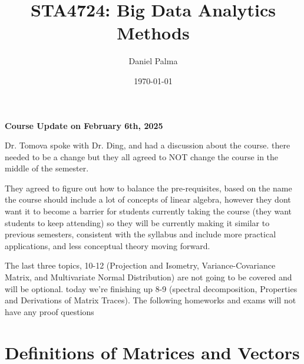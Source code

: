 \documentclass{article}
\author{Daniel Palma}
\date{\today}
\title{STA4724: Big Data Analytics Methods}
\newtheorem{theorem}{Theorem}
\theoremstyle{definition}
\theoremstyle{remark}
\begin{document}
\maketitle
\newpage

\vspace*{\fill}

\begin{center}
    \textbf{Course Update on February 6th, 2025}
\end{center}

Dr. Tomova spoke with Dr. Ding, and had a discussion about the course. there needed to be a change but they all agreed to NOT change the course in the middle of the semester.

They agreed to figure out how to balance the pre-requisites, based on the name the course should include a lot of concepts of linear algebra, however they dont want it to become a barrier for students currently taking the course (they want students to keep attending) so they will be currently making it similar to previous semesters, consistent with the syllabus and include more practical applications, and less conceptual theory moving forward.

The last three topics, 10-12 (Projection and Isometry, Variance-Covariance Matrix, and Multivariate Normal Distribution) are not going to be covered and will be optional. today we're finishing up 8-9 (spectral decomposition, Properties and Derivations of Matrix Traces). The following homeworks and exams will not have any proof questions

\vspace*{\fill}

\newpage

\tableofcontents
\newpage


\section{Definitions of Matrices and Vectors}
\end{document}
